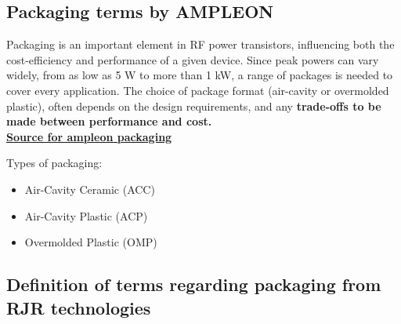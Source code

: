 \documentclass{article}
\begin{document}



\subsection{Packaging terms by AMPLEON}

Packaging is an important element in RF power transistors, influencing both the cost-efficiency and performance of a given device. Since peak powers can vary widely, from as low as 5 W to more than 1 kW, a range of packages is needed to cover every application. The choice of package format (air-cavity or overmolded plastic), often depends on the design requirements, and any \textbf{trade-offs to be made between performance and cost.} \\

\href{https://www.ampleon.com/packages.html}{\textbf{Source for ampleon packaging}}

Types of packaging:

\begin{itemize}
	\item Air-Cavity Ceramic (ACC)
	\item Air-Cavity Plastic (ACP)
	\item Overmolded Plastic (OMP)
\end{itemize}

\subsection{Definition of terms regarding packaging from RJR technologies}
\end{document}
